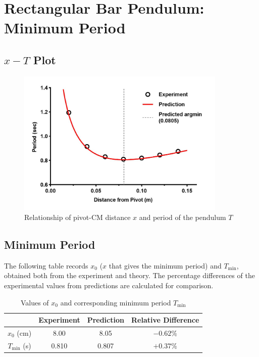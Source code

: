 

\rmfamily

\section{Rectangular Bar Pendulum: Minimum Period}
\subsection{$x-T$ Plot}

\begin{figure}[H]
	\centering\includegraphics[width=10cm]{icm1}
	\caption{Relationship of pivot-CM distance $x$ and period of the pendulum $T$ }
	\label{$Frequency-Intensity$ Graph for $70$cm tube}
\end{figure}

\subsection{Minimum Period}

The following table records $x_0$ ($x$ that gives the minimum period) and $T_{\text{min}}$, obtained both from the experiment and theory. The percentage differences of the experimental values from predictions are calculated for comparison.\\


\begin{table}[!htb]
\centering
\begin{tabular}{|c|c|c|c|}
	\hline 
	& Experiment & Prediction & Relative Difference \\ 
	\hline 
	$x_0$ (cm) & 8.00 & 8.05 & $-0.62\%$ \\ 
	\hline 
	$T_{\text{min}}$ (s) & 0.810 & 0.807 & $+0.37\%$ \\ 
	\hline 
\end{tabular}
\caption{Values of $x_0$ and corresponding minimum period $T_{\text{min}}$}
\end{table}

